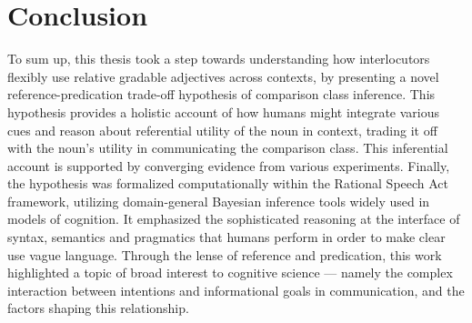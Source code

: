 \section{Conclusion}
To sum up, this thesis took a step towards understanding how interlocutors flexibly use relative gradable adjectives across contexts, by presenting a novel reference-predication trade-off hypothesis of comparison class inference. 
This hypothesis provides a holistic account of how %
humans might integrate various cues and reason about referential utility of the noun in context, trading it off with the noun's utility in communicating the comparison class. This inferential account is supported by converging evidence from various experiments. Finally, the hypothesis was formalized computationally within the Rational Speech Act framework, utilizing domain-general Bayesian inference tools widely used in models of cognition. %
 It emphasized the sophisticated reasoning at the interface of syntax, semantics and pragmatics that humans perform in order to make clear use vague language. 
Through the lense of reference and predication, this work highlighted a topic of broad interest to cognitive science --- namely the complex interaction between intentions and informational goals in communication, and the factors shaping this relationship.
